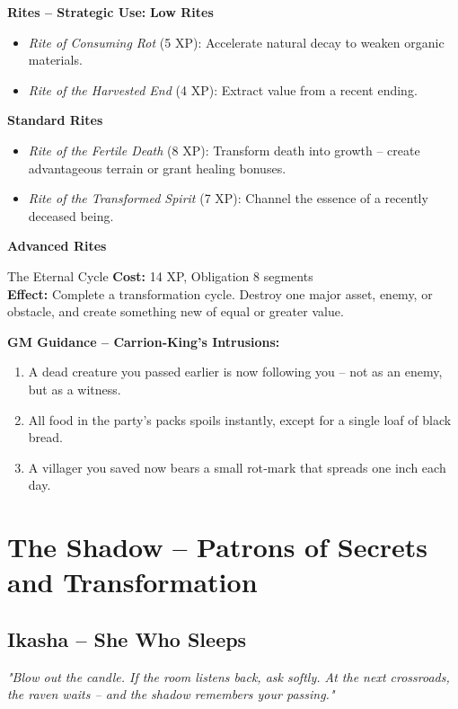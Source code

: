 \documentclass[10pt,a5paper]{book}
\begin{document}
\textbf{Rites -- Strategic Use:}
\textbf{Low Rites}
\begin{itemize}
    \item \textit{Rite of Consuming Rot} (5 XP): Accelerate natural decay to weaken organic materials.
    \item \textit{Rite of the Harvested End} (4 XP): Extract value from a recent ending.
\end{itemize}
\textbf{Standard Rites}
\begin{itemize}
    \item \textit{Rite of the Fertile Death} (8 XP): Transform death into growth -- create advantageous terrain or grant healing bonuses.
    \item \textit{Rite of the Transformed Spirit} (7 XP): Channel the essence of a recently deceased being.
\end{itemize}
\textbf{Advanced Rites}
\begin{patronbox}{The Eternal Cycle}
\textbf{Cost:} 14 XP, Obligation 8 segments \\
\textbf{Effect:} Complete a transformation cycle. Destroy one major asset, enemy, or obstacle, and create something new of equal or greater value.
\end{patronbox}

\textbf{GM Guidance -- Carrion‑King's Intrusions:}
\begin{enumerate}
    \item A dead creature you passed earlier is now following you -- not as an enemy, but as a witness.
    \item All food in the party's packs spoils instantly, except for a single loaf of black bread.
    \item A villager you saved now bears a small rot‑mark that spreads one inch each day.
\end{enumerate}

\clearpage

\section{The Shadow -- Patrons of Secrets and Transformation}

\subsection{Ikasha -- She Who Sleeps}
\label{patron:ikasha}

\textit{"Blow out the candle. If the room listens back, ask softly. At the next crossroads, the raven waits -- and the shadow remembers your passing."}
\end{document}
